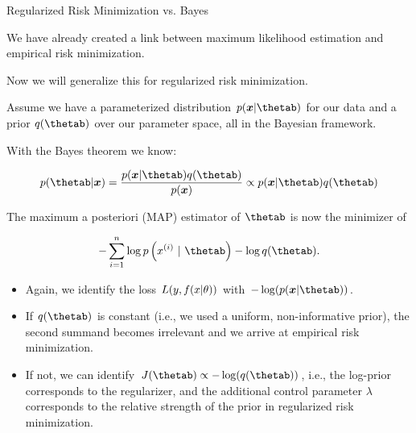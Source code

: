 \begin{vbframe} {Regularized Risk Minimization vs. Bayes}

We have already created a link between maximum likelihood estimation and 
empirical risk minimization.

\lz 

Now we will generalize this for regularized risk minimization.

\lz

Assume we have a parameterized distribution $p(\xv | \thetab)$ for our data and 
a prior $q(\thetab)$ over our parameter space, all in the Bayesian framework.

\lz 

With the Bayes theorem we know:

$$
p(\thetab | \xv) = \frac{p(\xv | \thetab) q(\thetab) }{p(\xv)} \propto 
p(\xv | \thetab) q(\thetab)
$$

\framebreak

The maximum a posteriori (MAP) estimator of $\thetab$ is now the minimizer of

$$
- \sumin \log p\left(\xi ~|~ \thetab\right) - \log q(\thetab).
$$

\begin{itemize}
  \item Again, we identify the loss $L(y, f(x | \theta))$ with $-\log(p(\xv | \thetab))$.
  \item If $q(\thetab)$ is constant (i.e., we used a uniform, non-informative 
  prior), the second summand becomes irrelevant and we arrive 
  at empirical risk minimization.
  \item If not, we can identify $J(\thetab) \propto -\log(q(\thetab))$, i.e., 
  the log-prior corresponds to the regularizer, and the additional control 
  parameter $\lambda$ corresponds to the relative strength of the prior in 
  regularized risk minimization.
\end{itemize}

\framebreak

\begin{figure}
  \centering
\end{figure}


\end{vbframe}
